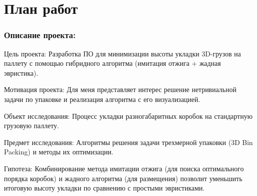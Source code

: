 \chapter{План работ}

\subsection*{Описание проекта:}
Цель проекта: Разработка ПО для минимизации высоты укладки 3D-грузов на паллету с помощью гибридного алгоритма (имитация отжига + жадная эвристика).

Мотивация проекта: Для меня представляет интерес решение нетривиальной задачи по упаковке и реализация алгоритма с его визуализацией.

Объект исследования: Процесс укладки разногабаритных коробок на стандартную грузовую паллету.

Предмет исследования: Алгоритмы решения задачи трехмерной упаковки (3D Bin Packing) и методы их оптимизации.

Гипотеза: Комбинирование метода имитации отжига (для поиска оптимального порядка коробок) и жадного алгоритма (для размещения) позволит уменьшить итоговую высоту укладки по сравнению с простыми эвристиками.

